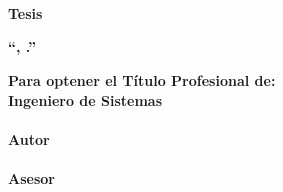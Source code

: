 \begin{titlepage}


\thispagestyle{empty}



\centering

\begin{adjustwidth}{6em}{6em}
	\centering
	\begin{spacing}{1.5}
		{\fontsize{\TamTrabajoIn}{18pt} \textbf{\MakeUppercase{\miUniversidadTwoLine}}}\\[0.5cm]
	\end{spacing}
\end{adjustwidth}
\begin{adjustwidth}{4em}{4em}
	\centering
	\begin{spacing}{1.5}
		{\fontsize{\TamOtros}{0pt} \textbf{\MakeUppercase{\miFacultad}}}\\[0.5cm]
		{\fontsize{\TamOtros}{0pt} \textbf{\MakeUppercase{\miEscuela}}}\\[0.5cm]
	\end{spacing}
\end{adjustwidth}
{\fontsize{\TamOtrosIn}{0pt} \textbf{Tesis}}
\\[0.5cm]

\begin{spacing}{1.5}
	\centering
	{\fontsize{\TamOtrosIn}{0pt} \textbf{``\titulo, \subtitulo.''}}\\[1.5cm]
\end{spacing}

{\fontsize{\TamOtrosIn}{0pt} \textbf{Para optener el Título Profesional de:}}
\\[0.5cm]
{\fontsize{\TamOtrosIn}{0pt} \textbf{{Ingeniero de Sistemas}}}
\\[1.5cm]
{\fontsize{\TamOtrosIn}{0pt} \textbf{\miNombre}}
\\[0.2cm]
{\fontsize{\TamOtrosIn}{0pt} \textbf{Autor}}
\\[1.5cm]
{\fontsize{\TamOtrosIn}{0pt} \textbf{\miTutor}}
\\[0.2cm]
{\fontsize{\TamOtrosIn}{0pt} \textbf{Asesor}}
\\[1.5cm]
{\fontsize{\TamOtrosJP}{0pt} \miUbicacion\space\miPais}
\\[0.1cm]
{\fontsize{\TamOtrosJP}{0pt} \Hoy}

\end{titlepage}

\if{}
\tikzexternalenable %
\fi
\restoregeometry